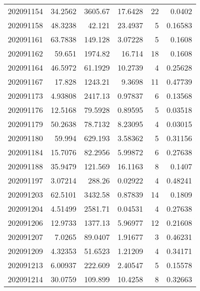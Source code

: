 \begin{tabular}{rrrrrr}
 202091154 &         34.2562  &     3605.67   &           17.6428  &          22 & 0.0402  \\
 202091158 &         48.3238  &       42.121  &           23.4937  &           5 & 0.16583 \\
 202091161 &         63.7838  &      149.128  &            3.07228 &           5 & 0.1608  \\
 202091162 &         59.651   &     1974.82   &           16.714   &          18 & 0.1608  \\
 202091164 &         46.5972  &       61.1929 &           10.2739  &           4 & 0.25628 \\
 202091167 &         17.828   &     1243.21   &            9.3698  &          11 & 0.47739 \\
 202091173 &          4.93808 &     2417.13   &            0.97837 &           6 & 0.13568 \\
 202091176 &         12.5168  &       79.5928 &            0.89595 &           5 & 0.03518 \\
 202091179 &         50.2638  &       78.7132 &            8.23095 &           4 & 0.03015 \\
 202091180 &         59.994   &      629.193  &            3.58362 &           5 & 0.31156 \\
 202091184 &         15.7076  &       82.2956 &            5.99872 &           6 & 0.27638 \\
 202091188 &         35.9479  &      121.569  &           16.1163  &           8 & 0.1407  \\
 202091197 &          3.07214 &      288.26   &            0.02922 &           4 & 0.48241 \\
 202091203 &         62.5101  &     3432.58   &            0.87839 &          14 & 0.1809  \\
 202091204 &          4.51499 &     2581.71   &            0.04531 &           4 & 0.27638 \\
 202091206 &         12.9733  &     1377.13   &            5.96977 &          12 & 0.21608 \\
 202091207 &          7.0265  &       89.0407 &            1.91677 &           3 & 0.46231 \\
 202091209 &          4.32353 &       51.6523 &            1.21209 &           4 & 0.34171 \\
 202091213 &          6.00937 &      222.609  &            2.40547 &           5 & 0.15578 \\
 202091214 &         30.0759  &      109.899  &           10.4258  &           8 & 0.32663 \\

\end{tabular}
